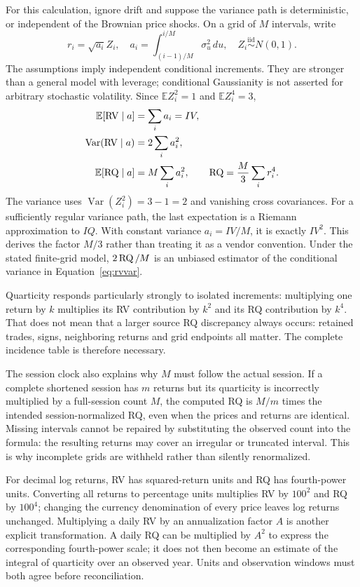 For this calculation, ignore drift and suppose the variance path is deterministic, or independent of the Brownian price shocks. On a grid of $M$ intervals, write
\begin{equation}
 r_i=\sqrt{a_i}Z_i,\quad a_i=\int_{(i-1)/M}^{i/M}\sigma_u^2\,du,
 \quad Z_i\mathrel{\overset{\mathrm{iid}}\sim}N(0,1).
\end{equation}
The assumptions imply independent conditional increments. They are stronger than a general model with leverage; conditional Gaussianity is not asserted for arbitrary stochastic volatility. Since $\mathbb E Z_i^2=1$ and $\mathbb E Z_i^4=3$,
\begin{align}
 \mathbb E[\operatorname{RV}\mid a]&=\sum_i a_i=IV,\label{eq:rvmean}\\
 \operatorname{Var}(\operatorname{RV}\mid a)&=2\sum_i a_i^2,\label{eq:rvvar}\\
 \mathbb E[\operatorname{RQ}\mid a]&=M\sum_i a_i^2,
 \qquad \operatorname{RQ}=\frac M3\sum_i r_i^4.\label{eq:rqmean}
\end{align}
The variance uses $\operatorname{Var}(Z_i^2)=3-1=2$ and vanishing cross covariances. For a sufficiently regular variance path, the last expectation is a Riemann approximation to $IQ$. With constant variance $a_i=IV/M$, it is exactly $IV^2$. This derives the factor $M/3$ rather than treating it as a vendor convention. Under the stated finite-grid model, $2\operatorname{RQ}/M$ is an unbiased estimator of the conditional variance in Equation~\eqref{eq:rvvar}.

Quarticity responds particularly strongly to isolated increments: multiplying one return by $k$ multiplies its RV contribution by $k^2$ and its RQ contribution by $k^4$. That does not mean that a larger source RQ discrepancy always occurs: retained trades, signs, neighboring returns and grid endpoints all matter. The complete incidence table is therefore necessary.

The session clock also explains why $M$ must follow the actual session. If a complete shortened session has $m$ returns but its quarticity is incorrectly multiplied by a full-session count $M$, the computed RQ is $M/m$ times the intended session-normalized RQ, even when the prices and returns are identical. Missing intervals cannot be repaired by substituting the observed count into the formula: the resulting returns may cover an irregular or truncated interval. This is why incomplete grids are withheld rather than silently renormalized.

For decimal log returns, RV has squared-return units and RQ has fourth-power units. Converting all returns to percentage units multiplies RV by $100^2$ and RQ by $100^4$; changing the currency denomination of every price leaves log returns unchanged. Multiplying a daily RV by an annualization factor $A$ is another explicit transformation. A daily RQ can be multiplied by $A^2$ to express the corresponding fourth-power scale; it does not then become an estimate of the integral of quarticity over an observed year. Units and observation windows must both agree before reconciliation.

